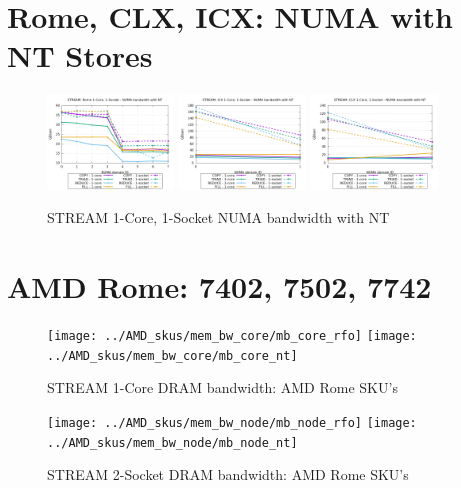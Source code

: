 \documentclass{article}
\begin{document}
\clearpage



\appendix
\appendixpage
\addappheadtotoc

\section{Rome, CLX, ICX: NUMA with NT Stores}
\begin{figure}[!ht]
    \centering
    \includegraphics[width=0.3\textwidth]{../mem_bw_numa/Rome_numa_nps4_compact_nt}
    \includegraphics[width=0.3\textwidth]{../mem_bw_numa/ICX_numa_nps1_compact_nt}
    \includegraphics[width=0.3\textwidth]{../mem_bw_numa/CLX_numa_nps1_compact_nt}
    \caption{STREAM 1-Core, 1-Socket NUMA bandwidth with NT}
    \label{figure:mem_bw_numa_nt}
\end{figure}

\section{AMD Rome: 7402, 7502, 7742}
\begin{figure}[!hb]
    \centering
    \texttt{[image: ../AMD\_skus/mem\_bw\_core/mb\_core\_rfo]}
    \texttt{[image: ../AMD\_skus/mem\_bw\_core/mb\_core\_nt]}
    \caption{STREAM 1-Core DRAM bandwidth: AMD Rome SKU's}
    \label{figure:mem_bw_core_rome_skus}
\end{figure}
\begin{figure}[!hb]
    \centering
    \texttt{[image: ../AMD\_skus/mem\_bw\_node/mb\_node\_rfo]}
    \texttt{[image: ../AMD\_skus/mem\_bw\_node/mb\_node\_nt]}
    \caption{STREAM 2-Socket DRAM bandwidth: AMD Rome SKU's}
    \label{figure:mem_bw_node_rome_skus}
\end{figure}
\end{document}
